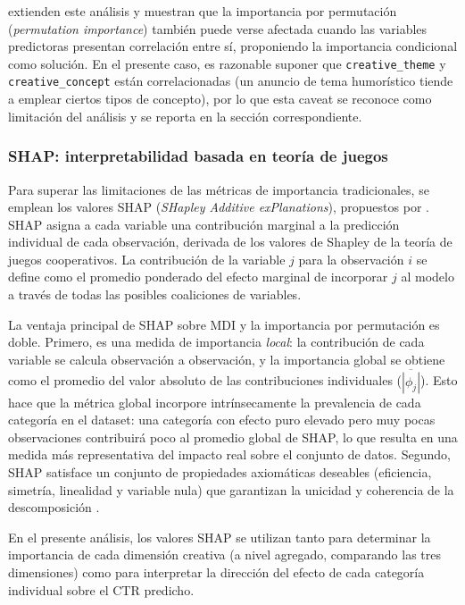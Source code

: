 \documentclass[12pt, a4paper]{report}
\begin{document}
\citet{strobl2008} extienden este análisis y muestran que la importancia por permutación
(\textit{permutation importance}) también puede verse afectada cuando las variables
predictoras presentan correlación entre sí, proponiendo la importancia condicional
como solución. En el presente caso, es razonable suponer que \texttt{creative\_theme}
y \texttt{creative\_concept} están correlacionadas (un anuncio de tema humorístico
tiende a emplear ciertos tipos de concepto), por lo que esta caveat se reconoce
como limitación del análisis y se reporta en la sección correspondiente.

\subsubsection*{SHAP: interpretabilidad basada en teoría de juegos}

Para superar las limitaciones de las métricas de importancia tradicionales,
se emplean los valores SHAP (\textit{SHapley Additive exPlanations}), propuestos
por \citet{lundberg2017}. SHAP asigna a cada variable una contribución marginal
a la predicción individual de cada observación, derivada de los valores de Shapley
de la teoría de juegos cooperativos. La contribución de la variable $j$ para la
observación $i$ se define como el promedio ponderado del efecto marginal de incorporar
$j$ al modelo a través de todas las posibles coaliciones de variables.

La ventaja principal de SHAP sobre MDI y la importancia por permutación es doble.
Primero, es una medida de importancia \textit{local}: la contribución de cada
variable se calcula observación a observación, y la importancia global se obtiene
como el promedio del valor absoluto de las contribuciones individuales
($\overline{|\phi_j|}$). Esto hace que la métrica global incorpore intrínsecamente
la prevalencia de cada categoría en el dataset: una categoría con efecto puro elevado
pero muy pocas observaciones contribuirá poco al promedio global de SHAP, lo que
resulta en una medida más representativa del impacto real sobre el conjunto de datos.
Segundo, SHAP satisface un conjunto de propiedades axiomáticas deseables (eficiencia,
simetría, linealidad y variable nula) que garantizan la unicidad y coherencia de
la descomposición \citep{lundberg2017}.

En el presente análisis, los valores SHAP se utilizan tanto para determinar la
importancia de cada dimensión creativa (a nivel agregado, comparando las tres
dimensiones) como para interpretar la dirección del efecto de cada categoría
individual sobre el CTR predicho.
\end{document}
